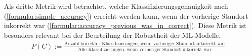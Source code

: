 Als dritte Metrik wird betrachtet, welche Klassifizierungsgenauigkeit nach (\ref{formular:simple_accuracy}) erreicht werden kann,
wenn der vorherige Standort inkorrekt war (\ref{formular:accuracy_previous_was_in_correct}).
Diese Metrik ist besonders relevant bei der Beurteilung der Robustheit der ML-Modelle.
\begin{align}
    \label{formular:accuracy_previous_was_in_correct}
    P(C) := \frac{\text{Anzahl korrekter Klassifizierungen, wenn vorheriger Standort inkorrekt war}}{\text{Alle Klassifizierungen, wenn vorheriger Standort inkorrekt war}}
\end{align}